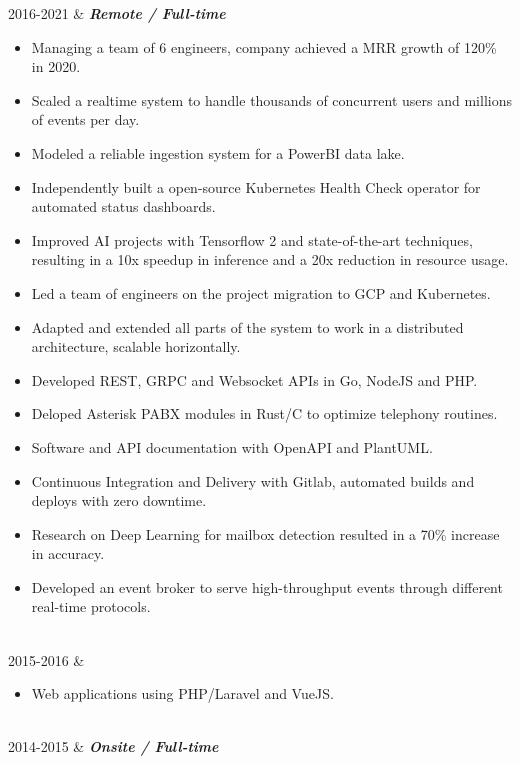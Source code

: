 \documentclass[]{cv-mauri}
\begin{document}
\begin{tabularcv}
    2016-2021   &   
                    \textbf{\textit{Remote / Full-time}}
            \begin{itemize}
            	\item Managing a team of 6 engineers, company achieved a MRR growth of 120\% in 2020.
            	\item Scaled a realtime system to handle thousands of concurrent users and millions of events per day.
            	\item Modeled a reliable ingestion system for a PowerBI data lake.
            	\item Independently built a open-source Kubernetes Health Check operator for automated status dashboards.
            	\item Improved AI projects with Tensorflow 2 and state-of-the-art techniques, resulting in a 10x speedup in inference and a 20x reduction in resource usage.
		    	\item Led a team of engineers on the project migration to GCP and Kubernetes.
		    	\item Adapted and extended all parts of the system to work in a distributed architecture, scalable horizontally.
		    	\item Developed REST, GRPC and Websocket APIs in Go, NodeJS and PHP.
		    	\item Deloped Asterisk PABX modules in Rust/C to optimize telephony routines.
		    	\item Software and API documentation with OpenAPI and PlantUML.
		    	\item Continuous Integration and Delivery with Gitlab, automated builds and deploys with zero downtime.
		    	\item Research on Deep Learning for mailbox detection resulted in a 70\% increase in accuracy.
		    	\item Developed an event broker to serve high-throughput events through different real-time protocols.
			\end{itemize}

		    \\[\vspacepar]
    2015-2016   &   
            \begin{itemize}
                  	\item Web applications using PHP/Laravel and VueJS.
            \end{itemize}

                    \\[\vspacepar]
	2014-2015   &   
					\textbf{\textit{Onsite / Full-time}}


\end{tabularcv}
\end{document}
